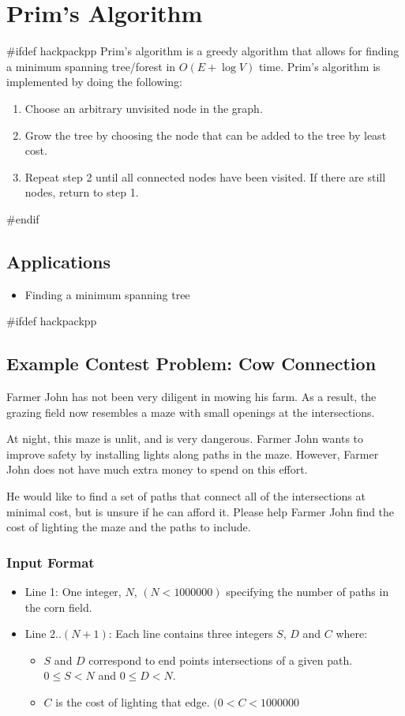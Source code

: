 \section{Prim's Algorithm}
#ifdef hackpackpp
Prim's algorithm is a greedy algorithm that allows for finding a minimum spanning tree/forest in $O(E + \log{V})$ time.
Prim's algorithm is implemented by doing the following:

\begin{enumerate}
	\item Choose an arbitrary unvisited node in the graph.
	\item Grow the tree by choosing the node that can be added to the tree by least cost.
	\item Repeat step 2 until all connected nodes have been visited. If there are still nodes, return to step 1.
\end{enumerate}

#endif
\subsection{Applications}
\begin{itemize}
	\item Finding a minimum spanning tree
\end{itemize}

#ifdef hackpackpp
\subsection{Example Contest Problem: Cow Connection}
Farmer John has not been very diligent in mowing his farm.
As a result, the grazing field now resembles a maze with small openings at the intersections.

At night, this maze is unlit, and is very dangerous.
Farmer John wants to improve safety by installing lights along paths in the maze.
However, Farmer John does not have much extra money to spend on this effort.

He would like to find a set of paths that connect all of the intersections at minimal cost, but is unsure if he can afford it.
Please help Farmer John find the cost of lighting the maze and the paths to include.
\subsubsection{Input Format}
\begin{itemize}
\item Line 1: One integer, $N$, $(N < 1000000)$ specifying the number of paths in the corn field.
\item Line 2..$(N+1)$: Each line contains three integers $S$, $D$ and $C$ where:
	\begin{itemize}
		\item $S$ and $D$ correspond to end points intersections of a given path. $0 \leq S < N$ and $0 \leq D < N$.
		\item $C$ is the cost of lighting that edge. $(0 < C < 1000000$
	\end{itemize}
\end{itemize}


